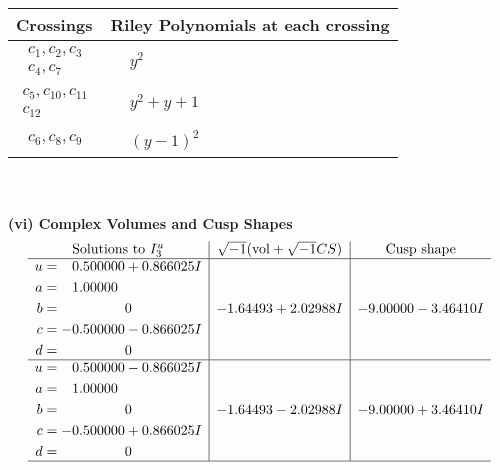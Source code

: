 \documentclass[1p]{elsarticle_modified}
\theoremstyle{definition}
\newcommand{\I}{\sqrt{-1}}
\begin{document}
\begin{tabular}{m{50pt}|m{274pt}}
Crossings & \hspace{64pt}Riley Polynomials at each crossing \\
\hline $$\begin{aligned}c_{1},c_{2},c_{3}\\c_{4},c_{7}\end{aligned}$$&$\begin{aligned}
&y^2
\end{aligned}$\\
\hline $$\begin{aligned}c_{5},c_{10},c_{11}\\c_{12}\end{aligned}$$&$\begin{aligned}
&y^2+y+1
\end{aligned}$\\
\hline $$\begin{aligned}c_{6},c_{8},c_{9}\end{aligned}$$&$\begin{aligned}
&(y-1)^2
\end{aligned}$\\
\hline
\end{tabular}\\~\\
\newpage\flushleft \textbf{(vi) Complex Volumes and Cusp Shapes}
$$\begin{array}{c|c|c}  
\text{Solutions to }I^u_{3}& \I (\text{vol} + \sqrt{-1}CS) & \text{Cusp shape}\\
 \hline 
\begin{aligned}
u &= \phantom{-}0.500000 + 0.866025 I \\
a &= \phantom{-}1.00000\phantom{ +0.000000I} \\
b &= \phantom{-0.000000 } 0 \\
c &= -0.500000 - 0.866025 I \\
d &= \phantom{-0.000000 } 0\end{aligned}
 & -1.64493 + 2.02988 I & -9.00000 - 3.46410 I \\ \hline\begin{aligned}
u &= \phantom{-}0.500000 - 0.866025 I \\
a &= \phantom{-}1.00000\phantom{ +0.000000I} \\
b &= \phantom{-0.000000 } 0 \\
c &= -0.500000 + 0.866025 I \\
d &= \phantom{-0.000000 } 0\end{aligned}
 & -1.64493 - 2.02988 I & -9.00000 + 3.46410 I\\
 \hline 
 \end{array}$$\newpage\newpage\renewcommand{\arraystretch}{1}
\end{document}
